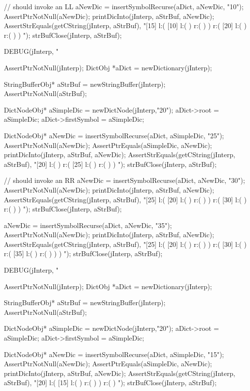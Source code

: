   // should invoke an LL
  aNewDic = insertSymbolRecurse(aDict, aNewDic, "10");
  AssertPtrNotNull(aNewDic);
  printDicInto(jInterp, aStrBuf, aNewDic);
  AssertStrEquals(getCString(jInterp, aStrBuf),
  "[15] l:( [10] l:(  ) r:(  )  ) r:( [20] l:(  ) r:(  )  ) ");
  strBufClose(jInterp, aStrBuf);
\stopCTest
\stopTestCase

\startCTest
  DEBUG(jInterp, "\n%

  AssertPtrNotNull(jInterp);
  DictObj *aDict = newDictionary(jInterp);

  StringBufferObj* aStrBuf = newStringBuffer(jInterp);
  AssertPtrNotNull(aStrBuf);
  
  DictNodeObj* aSimpleDic = newDictNode(jInterp,"20");
  aDict->root             = aSimpleDic;
  aDict->firstSymbol      = aSimpleDic;

  DictNodeObj* aNewDic = insertSymbolRecurse(aDict, aSimpleDic, "25");
  AssertPtrNotNull(aNewDic);
  AssertPtrEquals(aSimpleDic, aNewDic);
  printDicInto(jInterp, aStrBuf, aNewDic);
  AssertStrEquals(getCString(jInterp, aStrBuf),
  "[20] l:(  ) r:( [25] l:(  ) r:(  )  ) ");
  strBufClose(jInterp, aStrBuf);
  
  // should invoke an RR
  aNewDic = insertSymbolRecurse(aDict, aNewDic, "30");
  AssertPtrNotNull(aNewDic);
  printDicInto(jInterp, aStrBuf, aNewDic);
  AssertStrEquals(getCString(jInterp, aStrBuf),
  "[25] l:( [20] l:(  ) r:(  )  ) r:( [30] l:(  ) r:(  )  ) ");
  strBufClose(jInterp, aStrBuf);
  
  aNewDic = insertSymbolRecurse(aDict, aNewDic, "35");
  AssertPtrNotNull(aNewDic);
  printDicInto(jInterp, aStrBuf, aNewDic);
  AssertStrEquals(getCString(jInterp, aStrBuf),
  "[25] l:( [20] l:(  ) r:(  )  ) r:( [30] l:(  ) r:( [35] l:(  ) r:(  )  )  ) ");
  strBufClose(jInterp, aStrBuf);
\stopCTest
\stopTestCase

\startCTest
  DEBUG(jInterp, "\n%

  AssertPtrNotNull(jInterp);
  DictObj *aDict = newDictionary(jInterp);

  StringBufferObj* aStrBuf = newStringBuffer(jInterp);
  AssertPtrNotNull(aStrBuf);
  
  DictNodeObj* aSimpleDic = newDictNode(jInterp,"20");
  aDict->root             = aSimpleDic;
  aDict->firstSymbol      = aSimpleDic;

  DictNodeObj* aNewDic = insertSymbolRecurse(aDict, aSimpleDic, "15");
  AssertPtrNotNull(aNewDic);
  AssertPtrEquals(aSimpleDic, aNewDic);
  printDicInto(jInterp, aStrBuf, aNewDic);
  AssertStrEquals(getCString(jInterp, aStrBuf),
  "[20] l:( [15] l:(  ) r:(  )  ) r:(  ) ");
  strBufClose(jInterp, aStrBuf);
  
